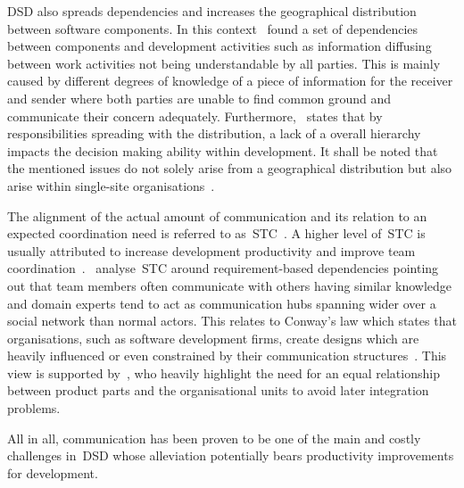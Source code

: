 \ac{DSD} also spreads dependencies and increases the geographical distribution between software components. In this context~\citet{ovaska2003architecture} found a set of dependencies between components and development activities such as information diffusing between work activities not being understandable by all parties. This is mainly caused by different degrees of knowledge of a piece of information for the receiver and sender where both parties are unable to find common ground and communicate their concern adequately. Furthermore,~\citet{ovaska2003architecture} states that by responsibilities spreading with the distribution, a lack of a overall hierarchy impacts the decision making ability within development. It shall be noted that the mentioned issues do not solely arise from a geographical distribution but also arise within single-site organisations~\citep{ovaska2003architecture}. 

The alignment of the actual amount of communication and its relation to an expected coordination need is referred to as~\ac{STC}~\citep{cataldo2006identcoord}. A higher level of~\ac{STC} is usually attributed to increase development productivity and improve team coordination~\citep{herbsleb2007gse}.~\citet{damian2013domainknowledge} analyse~\ac{STC} around requirement-based dependencies pointing out that team members often communicate with others having similar knowledge and domain experts tend to act as communication hubs spanning wider over a social network than normal actors. This relates to Conway's law which states that organisations, such as software development firms, create designs which are heavily influenced or even constrained by their communication structures~\citep{conway1968}. This view is supported by~\citet{coplien2004orgstruc}, who heavily highlight the need for an equal relationship between product parts and the organisational units to avoid later integration problems.

All in all, communication has been proven to be one of the main and costly challenges in~\ac{DSD} whose alleviation potentially bears productivity improvements for development.